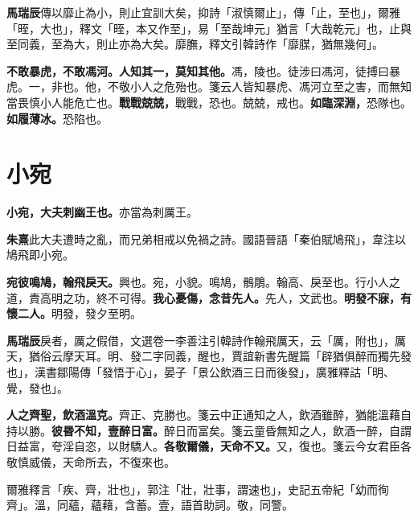 \begin{quoting}\textbf{馬瑞辰}傳以靡止為小，則止宜訓大矣，抑詩「淑慎爾止」，傳「止，至也」，爾雅「晊，大也」，釋文「晊，本又作至」，易「至哉坤元」猶言「大哉乾元」也，止與至同義，至為大，則止亦為大矣。靡膴，釋文引韓詩作「靡腜，猶無幾何」。\end{quoting}

\textbf{不敢暴虎，不敢馮河。人知其一，莫知其他。}{\footnotesize 馮，陵也。徒涉曰馮河，徒搏曰暴虎。一，非也。他，不敬小人之危殆也。箋云人皆知暴虎、馮河立至之害，而無知當畏慎小人能危亡也。}\textbf{戰戰兢兢，}{\footnotesize 戰戰，恐也。兢兢，戒也。}\textbf{如臨深淵，}{\footnotesize 恐隊也。}\textbf{如履薄冰。}{\footnotesize 恐陷也。}

\section{小宛}


\textbf{小宛，大夫刺幽王也。}{\footnotesize 亦當為刺厲王。}

\begin{quoting}\textbf{朱熹}此大夫遭時之亂，而兄弟相戒以免禍之詩。國語晉語「秦伯賦鳩飛」，韋注以鳩飛即小宛。\end{quoting}

\textbf{宛彼鳴鳩，翰飛戾天。}{\footnotesize 興也。宛，小貌。鳴鳩，鶻鵰。翰高、戾至也。行小人之道，責高明之功，終不可得。}\textbf{我心憂傷，念昔先人。}{\footnotesize 先人，文武也。}\textbf{明發不寐，有懷二人。}{\footnotesize 明發，發夕至明。}

\begin{quoting}\textbf{馬瑞辰}戾者，厲之假借，文選卷一李善注引韓詩作翰飛厲天，云「厲，附也」，厲天，猶俗云摩天耳。明、發二字同義，醒也，賈誼新書先醒篇「辟猶俱醉而獨先發也」，漢書鄒陽傳「發悟于心」，晏子「景公飲酒三日而後發」，廣雅釋詁「明、覺，發也」。\end{quoting}

\textbf{人之齊聖，飲酒溫克。}{\footnotesize 齊正、克勝也。箋云中正通知之人，飲酒雖醉，猶能溫藉自持以勝。}\textbf{彼昬不知，壹醉日富。}{\footnotesize 醉日而富矣。箋云童昏無知之人，飲酒一醉，自謂日益富，夸淫自恣，以財驕人。}\textbf{各敬爾儀，天命不又。}{\footnotesize 又，復也。箋云今女君臣各敬慎威儀，天命所去，不復來也。}

\begin{quoting}爾雅釋言「疾、齊，壯也」，郭注「壯，壯事，謂速也」，史記五帝紀「幼而徇齊」。溫，同蘊，蘊藉，含蓄。壹，語首助詞。敬，同警。\end{quoting}

